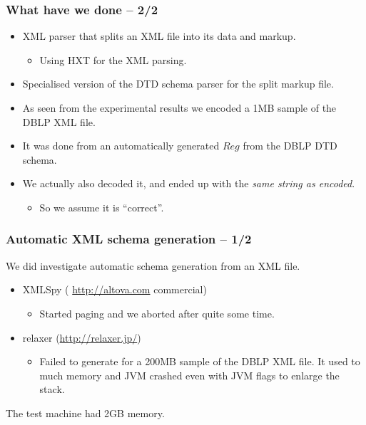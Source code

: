 \documentclass[slidestop,compress,mathserif, xcolor=table]{beamer}
\begin{document}
\begin{frame}[c]
  \frametitle{What have we done -- 2/2}
  \begin{itemize}

  \item XML parser that splits an XML file into its data and markup.
    \begin{itemize}
      
    \item Using HXT for the XML parsing.

    \end{itemize}

    \item Specialised version of the DTD schema parser for the split markup
      file.


  \item As seen from the experimental results we encoded a 1MB sample of the
    DBLP XML file.
    
    
  \item It was done from an automatically generated $Reg$ from the DBLP DTD schema.

  \item We actually also decoded it, and ended up with the
    \emph{same string as encoded}.
    
    \begin{itemize}
    \item So we assume it is ``correct''.
    \end{itemize}

  \end{itemize}
\end{frame}


\begin{frame}[c]
  \frametitle{Automatic XML schema generation -- 1/2}
  
  We did investigate automatic schema generation from an XML file.

  \begin{itemize}
  \item XMLSpy ( \url{http://altova.com} commercial)
    \begin{itemize}
    \item Started paging and we aborted after quite some time.
    \end{itemize}

  \item relaxer (\url{http://relaxer.jp/})
    \begin{itemize}
    \item Failed to generate for a 200MB sample of the DBLP XML file. It
      used to much memory and JVM crashed even with JVM flags to enlarge the stack.
    \end{itemize}
  \end{itemize}

  The test machine had 2GB memory.

\end{frame}
\end{document}
